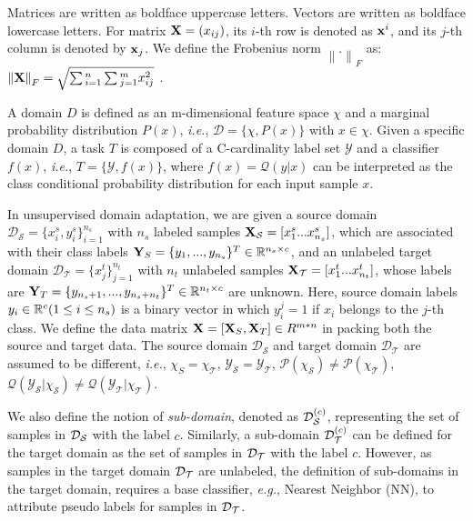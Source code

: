 \documentclass[journal,twocolumn]{IEEEtran}
\begin{document}
\begin{CJK*}{UTF8}{gkai}
Matrices are written as boldface uppercase letters. Vectors are written as boldface lowercase letters. For matrix ${\bf{X}} = ({x_{ij}})$, its $i$-th row is denoted as ${{\bf{x}}^i}$, and its $j$-th column is denoted by ${{\bf{x}}_j}$.  We define the Frobenius norm ${\left\| . \right\|_F}$ as: ${\left\| {\bf{X}} \right\|_F} = \sqrt {\sum {_{i = 1}^n} \sum {_{j = 1}^m} x_{ij}^2} $ . 
	
	A domain $D$ is defined as an m-dimensional feature space $\chi$ and a marginal probability distribution $P(x)$, \textit{i.e.}, $\mathcal{D}=\{\chi,P(x)\}$ with $x\in \chi$.  Given a specific domain $D$, a  task $T$ is composed of a C-cardinality label set $\mathcal{Y}$  and a classifier $f(x)$,\textit{ i.e.}, $T = \{\mathcal{Y},f(x)\}$, where $f({x}) = \mathcal{Q}( y |x)$ can be interpreted as the class conditional probability distribution for each input sample $x$. 
	
	
	In unsupervised domain adaptation, we are given a source domain $\mathcal{D_S}=\{x_{i}^{s},y_{i}^{s}\}_{i=1}^{n_s}$ with $n_s$ labeled samples ${{\bf{X}}_{\cal S}} = [x_1^s...x_{{n_s}}^s]$, which are associated with their class labels ${{\bf{Y}}_S} = {\{ {y_1},...,{y_{{n_s}}}\} ^T} \in {{\bf{\mathbb{R}}}^{{n_s} \times c}}$, and an unlabeled target domain $\mathcal{D_T}=\{x_{j}^{t}\}_{j=1}^{n_t}$ with $n_t$  unlabeled samples ${{\bf{X}}_{\cal T}} = [x_1^t...x_{{n_t}}^t]$, whose labels are ${{\bf{Y}}_T} = {\{ {y_{{n_s} + 1}},...,{y_{{n_s} + {n_t}}}\} ^T} \in {{\bf{\mathbb{R}}}^{{n_t} \times c}}$ are unknown. Here, source domain labels  ${y_i} \in {{\bf{\mathbb{R}}}^c}(1 \le i \le {n_s})$ is a binary vector in which $y_i^j = 1$ if ${x_i}$ belongs to the $j$-th class. We  define the data matrix ${\bf{X}} = [{{\bf{X}}_S},{{\bf{X}}_T}] \in {R^{m*n}}$ in packing both the source and target data. The source domain $\mathcal{D_S}$ and target domain $\mathcal{D_T}$ are assumed to be different, \textit{i.e.},  $\mathcal{\chi}_S=\mathcal{{\chi}_T}$, $\mathcal{Y_S}=\mathcal{Y_T}$, $\mathcal{P}(\mathcal{\chi_S}) \neq \mathcal{P}(\mathcal{\chi_T})$, $\mathcal{Q}(\mathcal{Y_S}|\mathcal{\chi_{S}}) \neq \mathcal{Q}(\mathcal{Y_T}|\mathcal{\chi_{T}})$.
	
	
	We also define the notion of \textit{sub-domain}, denoted as ${\cal D}_{\cal S}^{(c)}$, representing the set of samples in ${{\cal D}_{\cal S}}$ with the label $c$. Similarly, a sub-domain ${\cal D}_{\cal T}^{(c)}$ can be defined for the target domain as the set of samples in ${{\cal D}_{\cal T}}$ with the label $c$. However, as samples in the target domain ${{\cal D}_{\cal T}}$ are unlabeled, the definition of sub-domains in the target domain, requires a base classifier,\textit{ e.g.}, Nearest Neighbor (NN),  to attribute  pseudo labels for samples in ${{\cal D}_{\cal T}}$.
	

\end{CJK*}
\end{document}
